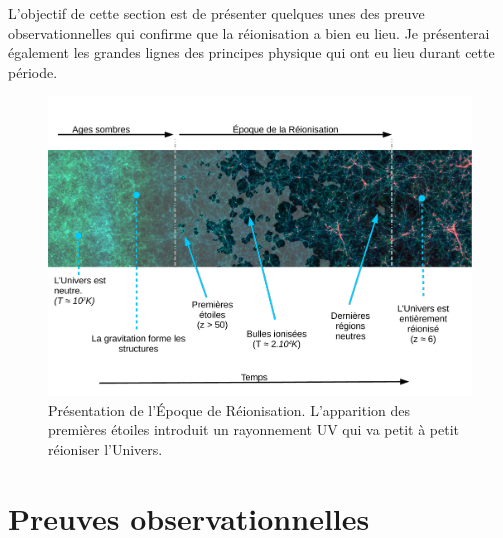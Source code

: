 L'objectif de cette section est de présenter quelques unes des preuve observationnelles qui confirme que la réionisation a bien eu lieu.
Je présenterai également les grandes lignes des principes physique qui ont eu lieu durant cette période.




\begin{figure}
\centering
        \includegraphics[width=\textwidth]{img/01/frise_legend.pdf} 
        \caption[Présentation de l'EoR]{Présentation de l'Époque de Réionisation. 
        L'apparition des premières étoiles introduit un rayonnement UV qui va petit à petit réioniser l'Univers.}
 		\label{fig:frise}
\end{figure}


\section{Preuves observationnelles}
\label{sec_contraintes_obs}

